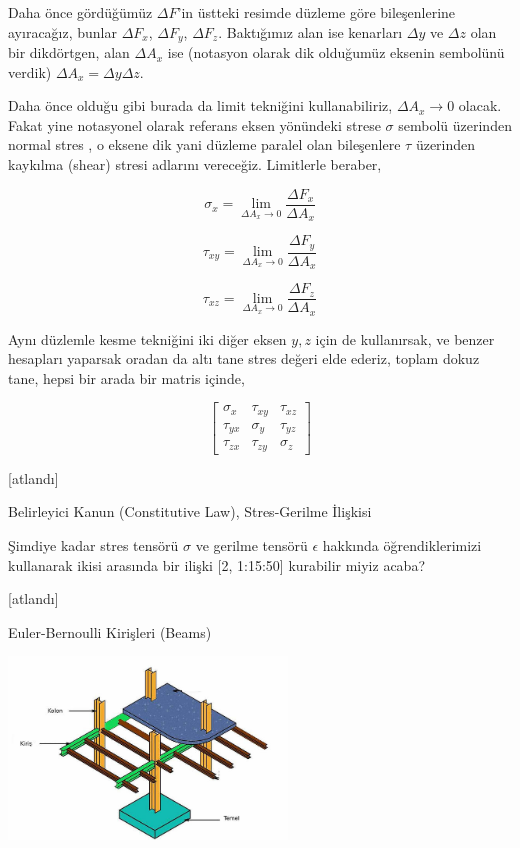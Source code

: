 \documentclass[12pt,fleqn]{article}\usepackage{../../common}
\begin{document}
Daha önce gördüğümüz $\Delta F$'in üstteki resimde düzleme göre bileşenlerine
ayıracağız, bunlar $\Delta F_x$, $\Delta F_y$, $\Delta F_z$. Baktığımız alan ise
kenarları $\Delta y$ ve $\Delta z$ olan bir dikdörtgen, alan $\Delta A_x$ ise
(notasyon olarak dik olduğumüz eksenin sembolünü verdik)
$\Delta A_x = \Delta y \Delta z$.

Daha önce olduğu gibi burada da limit tekniğini kullanabiliriz, $\Delta A_x \to
0$ olacak. Fakat yine notasyonel olarak referans eksen yönündeki strese $\sigma$
sembolü üzerinden normal stres , o eksene dik yani düzleme paralel olan
bileşenlere $\tau$ üzerinden kaykılma (shear) stresi adlarını vereceğiz.
Limitlerle beraber,

$$
\sigma_x = \lim_{\Delta A_x \to 0 } \frac{\Delta F_x}{\Delta A_x}
$$

$$
\tau_{xy} = \lim_{\Delta A_x \to 0 } \frac{\Delta F_y}{\Delta A_x}
$$

$$
\tau_{xz} = \lim_{\Delta A_x \to 0 } \frac{\Delta F_z}{\Delta A_x}
$$

Aynı düzlemle kesme tekniğini iki diğer eksen $y,z$ için de kullanırsak, ve
benzer hesapları yaparsak oradan da altı tane stres değeri elde ederiz, toplam
dokuz tane, hepsi bir arada bir matris içinde,

$$
\left[\begin{array}{rrr}
\sigma_x & \tau_{xy} & \tau_{xz} \\
\tau_{yx} & \sigma_y & \tau_{yz} \\
\tau_{zx} & \tau_{zy} & \sigma_z
\end{array}\right]
$$

[atlandı]

Belirleyici Kanun (Constitutive Law), Stres-Gerilme İlişkisi

Şimdiye kadar stres tensörü $\sigma$ ve gerilme tensörü $\epsilon$ hakkında
öğrendiklerimizi kullanarak ikisi arasında bir ilişki [2, 1:15:50] kurabilir
miyiz acaba?

[atlandı]

Euler-Bernoulli Kirişleri (Beams)

\includegraphics[width=20em]{phy_020_strs_02_09.jpg}
\end{document}

